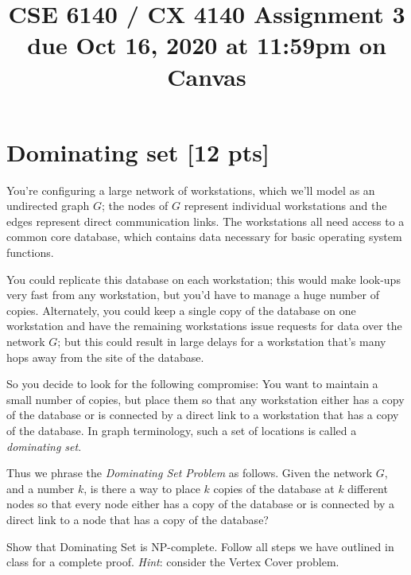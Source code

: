 \documentclass{article}
\title{CSE 6140 / CX 4140 Assignment 3\\due Oct 16, 2020 at 11:59pm on Canvas }
\author{}
\date{}
\begin{document}
\maketitle


\section{Dominating set [12 pts]}
You’re configuring a large network of workstations, which we’ll model as
an undirected graph $G$; the nodes of $G$ represent individual workstations
and the edges represent direct communication links. The workstations all
need access to a common core database, which contains data necessary
for basic operating system functions.

You could replicate this database on each workstation; this would
make look-ups very fast from any workstation, but you’d have to manage
a huge number of copies. Alternately, you could keep a single copy of the
database on one workstation and have the remaining workstations issue
requests for data over the network $G$; but this could result in large delays
for a workstation that’s many hops away from the site of the database.

So you decide to look for the following compromise: You want to
maintain a small number of copies, but place them so that any workstation
either has a copy of the database or is connected by a direct link to a
workstation that has a copy of the database. In graph terminology, such
a set of locations is called a {\em dominating set}.

Thus we phrase the {\em Dominating Set Problem} as follows. Given the
network $G$, and a number $k$, is there a way to place $k$ copies of the database
at $k$ different nodes so that every node either has a copy of the database
or is connected by a direct link to a node that has a copy of the database?

Show that Dominating Set is NP-complete. Follow all steps we have outlined in class for a complete proof. \emph{Hint}: consider the Vertex Cover problem.
\end{document}

